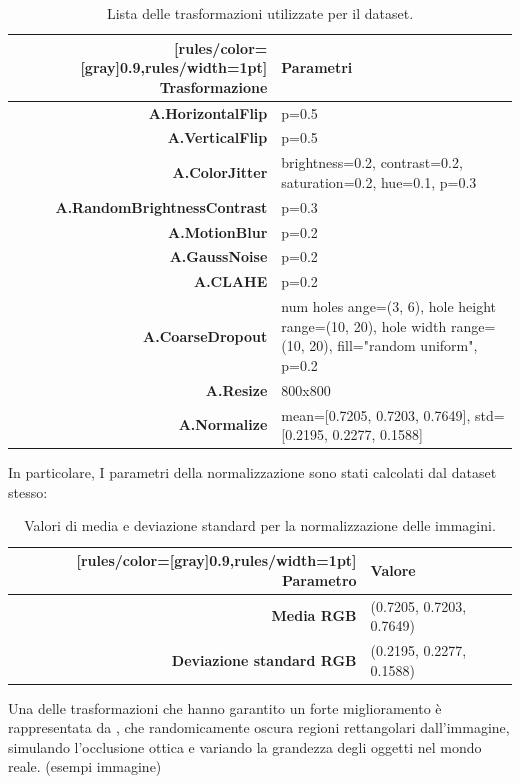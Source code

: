 \documentclass[minted, draw]{../tex/hebdomon}
\begin{document}
%
\begin{table}[!ht]
	\begin{NiceTabular}{rX}[rules/color=[gray]{0.9},rules/width=1pt]
		\CodeBefore
		\Body
		\toprule
		\textbf{Trasformazione}      & \textbf{Parametri}                                \\
		\midrule
		\textbf{A.HorizontalFlip} & p=0.5          \\
		\textbf{A.VerticalFlip}   & p=0.5        \\
		\textbf{A.ColorJitter} & brightness=0.2, contrast=0.2, saturation=0.2, hue=0.1, p=0.3\\
		\textbf{A.RandomBrightnessContrast} & p=0.3\\
		\textbf{A.MotionBlur} & p=0.2\\
		\textbf{A.GaussNoise} & p=0.2\\
		\textbf{A.CLAHE} & p=0.2 \\
		\textbf{A.CoarseDropout} & num holes ange=(3, 6), hole height range=(10, 20), hole width range=(10, 20), fill="random uniform", p=0.2 \\
		\textbf{A.Resize} & 800x800 \\
		\textbf{A.Normalize} & mean=[0.7205, 0.7203, 0.7649], std=[0.2195, 0.2277, 0.1588] \\
		\bottomrule
	\end{NiceTabular}
	\caption{Lista delle trasformazioni utilizzate per il dataset.}
\end{table}
%


In particolare, I parametri della normalizzazione sono stati calcolati dal dataset stesso:
\begin{table}[!ht]
	\begin{NiceTabular}{rX}[rules/color=[gray]{0.9},rules/width=1pt]
		\CodeBefore
		\Body
		\toprule
		\textbf{Parametro}      & \textbf{Valore}                                \\
		\midrule
		\textbf{Media RGB} & (0.7205, 0.7203, 0.7649) \\
		\textbf{Deviazione standard RGB} & (0.2195, 0.2277, 0.1588) \\
		\bottomrule
	\end{NiceTabular}
	\caption{Valori di media e deviazione standard per la normalizzazione delle immagini.}
\end{table}

Una delle trasformazioni che hanno garantito un forte miglioramento è rappresentata da , che randomicamente oscura regioni rettangolari dall’immagine, simulando l’occlusione ottica e variando la grandezza degli oggetti nel mondo reale. (esempi immagine)
\end{document}
